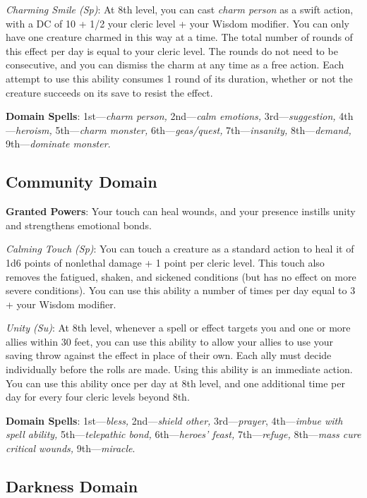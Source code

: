 \textit{Charming Smile (Sp)}: At 8th level, you can cast \textit{charm person} as a swift action, with a DC of 10 + 1/2 your cleric level + your Wisdom modifier. You can only have one creature charmed in this way at a time. The total number of rounds of this effect per day is equal to your cleric level. The rounds do not need to be consecutive, and you can dismiss the charm at any time as a free action. Each attempt to use this ability consumes 1 round of its duration, whether or not the creature succeeds on its save to resist the effect.
				
\textbf{Domain Spells}: 1st---\textit{charm person, }2nd---\textit{calm emotions, }3rd---\textit{suggestion, }4th---\textit{heroism, }5th---\textit{charm monster, }6th---\textit{geas/quest, }7th---\textit{insanity, }8th---\textit{demand, }9th---\textit{dominate monster}. 
				
\subsection{Community Domain}

				
\textbf{Granted Powers}: Your touch can heal wounds, and your presence instills unity and strengthens emotional bonds.
				
\textit{Calming Touch (Sp)}: You can touch a creature as a standard action to heal it of 1d6 points of nonlethal damage + 1 point per cleric level. This touch also removes the fatigued, shaken, and sickened conditions (but has no effect on more severe conditions). You can use this ability a number of times per day equal to 3 + your Wisdom modifier.
				
\textit{Unity (Su)}: At 8th level, whenever a spell or effect targets you and one or more allies within 30 feet, you can use this ability to allow your allies to use your saving throw against the effect in place of their own. Each ally must decide individually before the rolls are made. Using this ability is an immediate action. You can use this ability once per day at 8th level, and one additional time per day for every four cleric levels beyond 8th.
				
\textbf{Domain Spells}: 1st---\textit{bless, }2nd---\textit{shield other, }3rd---\textit{prayer}, 4th---\textit{imbue with spell ability, }5th---\textit{telepathic bond, }6th---\textit{heroes' feast, }7th---\textit{refuge, }8th---\textit{mass cure critical wounds, }9th---\textit{miracle}.
				
\subsection{Darkness Domain}

